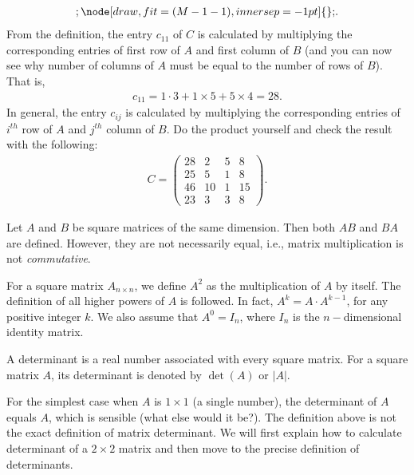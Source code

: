 \documentclass{subfile}
\begin{document}
\begin{example}
\begin{align*}
{{					};
					\node[draw,fit=(M-1-1),inner sep=-1pt] {};
				}
				.
				\end{align*}
			From the definition, the entry $c_{11}$ of $C$ is calculated by multiplying the corresponding entries of first row of $A$ and first column of $B$ (and you can now see why number of columns of $A$ must be equal to the number of rows of $B$). That is,
				\begin{align*}
					c_{11}=1 \cdot 3 + 1 \times 5 + 5 \times 4 = 28.
				\end{align*}
			In general, the entry $c_{ij}$ is calculated by multiplying the corresponding entries of $i^{th}$ row of $A$ and $j^{th}$ column of $B$. Do the product yourself and check the result with the following:
			\begin{align*}
			C = \begin{pmatrix}
				{28}&2&5&8\\
				{25}&5&1&8\\
				{46}&{10}&1&{15}\\
				{23}&3&3&8
				\end{pmatrix}.
			\end{align*}
	\end{example}
	
	\begin{note}
		Let $A$ and $B$ be square matrices of the same dimension. Then both $AB$ and $BA$ are defined. However, they are not necessarily equal, i.e., matrix multiplication is not \textit{commutative}.
	\end{note}
	
	
	\begin{definition}
		For a square matrix $A_{n\times n}$, we define $A^2$ as the multiplication of $A$ by itself. The definition of all higher powers of $A$ is followed. In fact, $A^k=A \cdot A^{k-1}$, for any positive integer $k$. We also assume that $A^{0}=I_n$, where $I_n$ is the $n-$dimensional identity matrix.
	\end{definition}
	
	\begin{definition}
		A determinant is a real number associated with every square matrix. For a square matrix $A$, its determinant is denoted by $\det(A)$ or $|A|$.
	\end{definition}
	
For the simplest case when $A$ is $1\times 1$ (a single number), the determinant of $A$ equals $A$, which is sensible (what else would it be?). The definition above is not the exact definition of matrix determinant. We will first explain how to calculate determinant of a $2\times 2$ matrix and then move to the precise definition of determinants.
\end{document}
